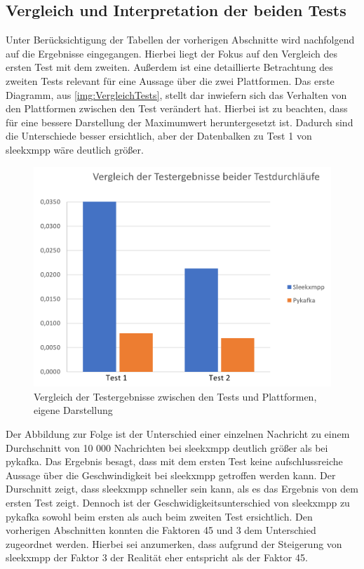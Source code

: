 \documentclass[a4paper,titlepage,halfparskip,12pt]{scrreprt}
\begin{document}
\begin{onehalfspacing}
\subsection*{Vergleich und Interpretation der beiden Tests}
Unter Berücksichtigung der Tabellen der vorherigen Abschnitte wird nachfolgend auf die Ergebnisse eingegangen. Hierbei liegt der Fokus auf den Vergleich des ersten Test mit dem zweiten. Außerdem ist eine detaillierte Betrachtung des zweiten Tests relevant für eine Aussage über die zwei Plattformen. Das erste Diagramm, aus \autoref{img:VergleichTests}, stellt dar inwiefern sich das Verhalten von den Plattformen zwischen den Test verändert hat. Hierbei ist zu beachten, dass für eine bessere Darstellung der Maximumwert heruntergesetzt ist. Dadurch sind die Unterschiede besser ersichtlich, aber der Datenbalken zu Test 1 von sleekxmpp wäre deutlich größer.
\begin{figure}[h]
	\centering
	\includegraphics[scale=0.8]{images/VergleichTests}
	\caption{Vergleich der Testergebnisse zwischen den Tests und Plattformen, eigene Darstellung}
	\label{img:VergleichTests}
\end{figure}
Der Abbildung zur Folge ist der Unterschied einer einzelnen Nachricht zu einem Durchschnitt von 10 000 Nachrichten bei sleekxmpp deutlich größer als bei pykafka. Das Ergebnis besagt, dass mit dem ersten Test keine aufschlussreiche Aussage über die Geschwindigkeit bei sleekxmpp getroffen werden kann. Der Durschnitt zeigt, dass sleekxmpp schneller sein kann, als es das Ergebnis von dem ersten Test zeigt. Dennoch ist der Geschwidigkeitsunterschied von sleekxmpp zu pykafka sowohl beim ersten als auch beim zweiten Test ersichtlich. Den vorherigen Abschnitten konnten die Faktoren 45 und 3 dem Unterschied zugeordnet werden. Hierbei sei anzumerken, dass aufgrund der Steigerung von sleekxmpp der Faktor 3 der Realität eher entspricht als der Faktor 45.\\

\end{onehalfspacing}
\end{document}
